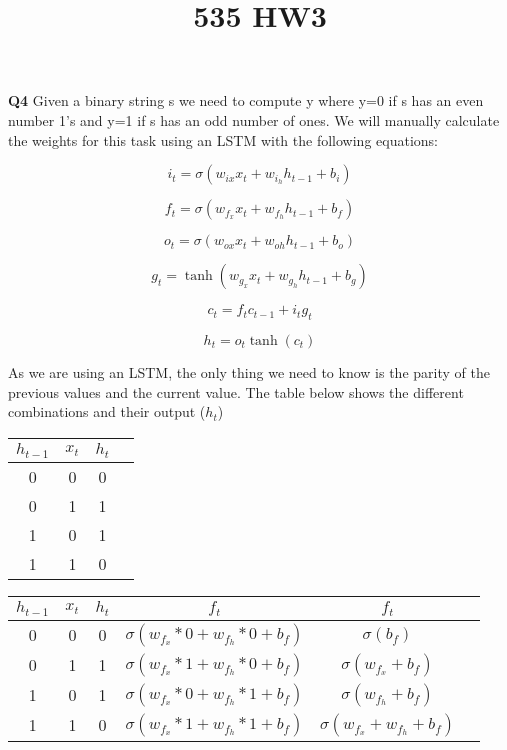 \documentclass{article}
\title{535 HW3}
\begin{document}
\textbf{Q4} Given a binary string s we need to compute y where y=0 if s has an even number 1's and y=1 if s has an odd number of ones. We will manually calculate the weights for this task using an LSTM with the following equations:


\begin{equation}
    i_t = \sigma(w_{ix}x_t + w_{i_h}h_{t-1}+b_i) 
\end{equation}

\begin{equation}
    f_t = \sigma(w_{f_x}x_t + w_{f_h}h_{t-1}+b_f) 
\end{equation}

\begin{equation}
    o_t = \sigma(w_{ox}x_t + w_{oh}h_{t-1}+b_o) 
\end{equation}

\begin{equation}
    g_t = \tanh(w_{g_x}x_t + w_{g_h}h_{t-1}+b_g) 
\end{equation}

\begin{equation}
    c_t = f_t c_{t-1} + i_t g_t
\end{equation}

\begin{equation}
    h_t = o_t\tanh(c_t)
\end{equation}

As we are using an LSTM, the only thing we need to know is the parity of the previous values and the current value. The table below shows the different combinations and their output ($h_t$)

\begin{center}\begin{tabular}{ |c|c|c|c| } 
\hline
$h_{t-1}$ & $x_t$ & $h_t$ \\
\hline
0 & 0 & 0 \\ 
0 & 1 & 1 \\ 
1 & 0 & 1 \\ 
1 & 1 & 0 \\ 
\hline
\end{tabular}\end{center}

\begin{center}\begin{tabular}{ |c|c|c|c|c|c| } 
\hline
$h_{t-1}$ & $x_t$ & $h_t$ & $f_t$ & $f_t$ \\
\hline
0 & 0 & 0 & $\sigma(w_{f_x}*0 + w_{f_h}*0+b_f)$ &$\sigma(b_f)$ \\ 
0 & 1 & 1 & $\sigma(w_{f_x}*1 + w_{f_h}*0+b_f)$ & $\sigma(w_{f_x}+b_f)$ \\ 
1 & 0 & 1 & $\sigma(w_{f_x}*0 + w_{f_h}*1+b_f)$ & $\sigma(w_{f_h}+b_f)$ \\ 
1 & 1 & 0 & $\sigma(w_{f_x}*1 + w_{f_h}*1+b_f)$& $\sigma(w_{f_x} + w_{f_h}+b_f)$ \\ 
\hline
\end{tabular}\end{center}
\end{document}
